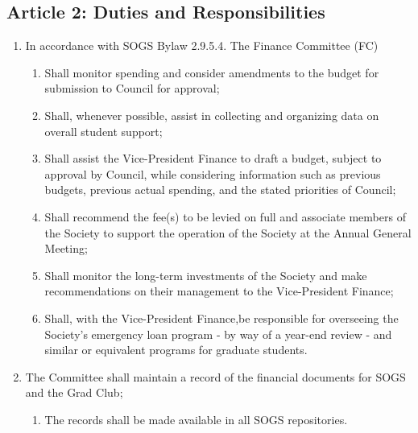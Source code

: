 \subsection{Article 2: Duties and Responsibilities}
\begin{enumerate}[label*=\arabic*., align=left]	
	\item In accordance with SOGS Bylaw 2.9.5.4. The Finance Committee (FC) 
	\begin{enumerate}[label*=\arabic*., align=left]	
		\item Shall monitor spending and consider amendments to the budget for submission to Council for approval;
		\item Shall, whenever possible, assist in collecting and organizing data on overall student support;
		\item Shall assist the Vice-President Finance to draft a budget, subject to approval by Council, while considering information such as previous budgets, previous actual spending, and the stated priorities of Council;
		\item Shall recommend the fee(s) to be levied on full and associate members of the Society to support the operation of the Society at the Annual General Meeting;
		\item Shall monitor the long-term investments of the Society and make recommendations on their management to the Vice-President Finance;
		\item Shall, with the Vice-President Finance,be responsible for overseeing the Society's emergency loan program - by way of a year-end review - and similar or equivalent programs for graduate students. 
		\end{enumerate}
	\item The Committee shall maintain a record of the financial documents for SOGS and the Grad Club;
		\begin{enumerate}[label*=\arabic*., align=left]	
		\item The records shall be made available in all SOGS repositories.
		\end{enumerate}
	\end{enumerate}

